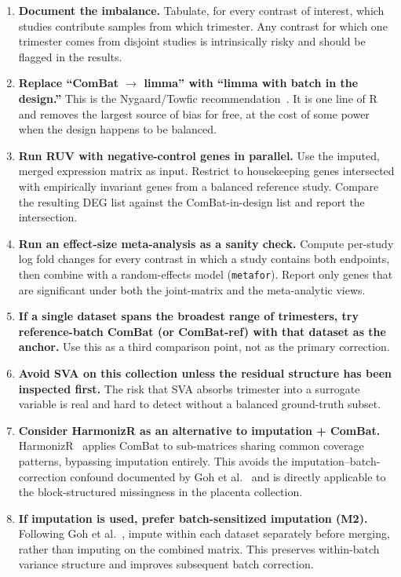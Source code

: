 \documentclass[11pt,a4paper]{article}
\begin{document}
\begin{enumerate}
  \item \textbf{Document the imbalance.} Tabulate, for every
        contrast of interest, which studies contribute samples from
        which trimester. Any contrast for which one trimester comes
        from disjoint studies is intrinsically risky and should be
        flagged in the results.

  \item \textbf{Replace ``ComBat $\to$ limma'' with
        ``limma with batch in the design.''} This is the
        Nygaard/Towfic recommendation~\cite{nygaard2016,towfic2017}.
        It is one line of R and removes the largest source of bias
        for free, at the cost of some power when the design happens
        to be balanced.

  \item \textbf{Run RUV with negative-control genes
        in parallel.} Use the imputed, merged expression matrix as
        input. Restrict to housekeeping genes intersected with
        empirically invariant genes from a balanced reference
        study. Compare the resulting DEG list against the
        ComBat-in-design list and report the intersection.

  \item \textbf{Run an effect-size meta-analysis as a sanity
        check.} Compute per-study log fold changes for every
        contrast in which a study contains both endpoints, then
        combine with a random-effects model (\texttt{metafor}).
        Report only genes that are significant under both the
        joint-matrix and the meta-analytic views.

  \item \textbf{If a single dataset spans the broadest range of
        trimesters, try reference-batch ComBat (or ComBat-ref) with
        that dataset as the anchor.} Use this as a third comparison
        point, not as the primary correction.

  \item \textbf{Avoid SVA on this collection unless the residual
        structure has been inspected first.} The risk that SVA
        absorbs trimester into a surrogate variable is real and
        hard to detect without a balanced ground-truth subset.

  \item \textbf{Consider HarmonizR as an alternative to
        imputation + ComBat.} HarmonizR~\cite{voss2022} applies
        ComBat to sub-matrices sharing common coverage patterns,
        bypassing imputation entirely. This avoids the
        imputation--batch-correction confound documented by
        Goh et al.~\cite{goh2023} and is directly applicable to
        the block-structured missingness in the placenta collection.

  \item \textbf{If imputation is used, prefer batch-sensitized
        imputation (M2).} Following Goh et al.~\cite{goh2023},
        impute within each dataset separately before merging, rather
        than imputing on the combined matrix. This preserves
        within-batch variance structure and improves subsequent
        batch correction.
\end{enumerate}
\end{document}
